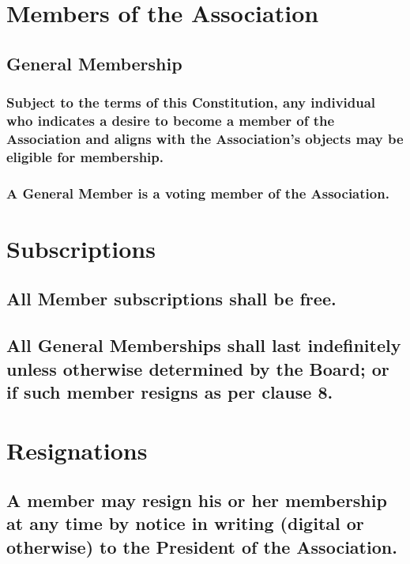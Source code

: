 \documentclass{article}
\newenvironment{subs}
  {\adjustwidth{2em}{0pt}}
  {\endadjustwidth}
\begin{document}
\section{Members of the Association}
\begin{subs}
\subsection{General Membership}

\begin{subs}
\subsubsection{Subject to the terms of this Constitution, any individual who indicates a desire to become a member of the Association and aligns with the Association's objects may be eligible for membership.}
\subsubsection{A General Member is a voting member of the Association.}
\end{subs}
\end{subs}

\section{Subscriptions}
\begin{subs}
\subsection{All Member subscriptions shall be free.}
\subsection{All General Memberships shall last indefinitely unless otherwise determined by the Board; or if such member resigns as per clause 8.}
\end{subs}

\section{Resignations}
\begin{subs}
\subsection{A member may resign his or her membership at any time by notice in writing (digital or otherwise) to the President of the Association.}
\end{subs}
 
\end{document}
